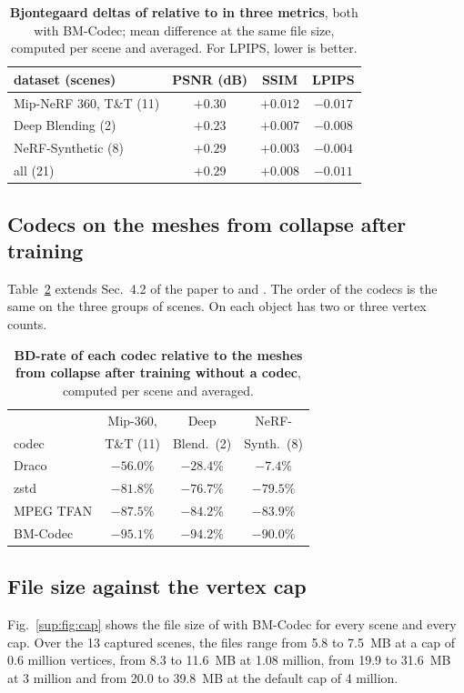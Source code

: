 \begin{table}[h]\centering\footnotesize
\caption{\textbf{Bjontegaard deltas of \BM relative to \MSc in three metrics}, both with BM-Codec; mean difference at the same file size, computed per scene and averaged. For LPIPS, lower is better.}
\label{sup:tab:bd-metrics}
\begin{tabular}{@{}lccc@{}}
\toprule
dataset (scenes) & PSNR (dB) & SSIM & LPIPS \\
\midrule
Mip-NeRF 360, T\&T (11) & $+0.30$ & $+0.012$ & $-0.017$ \\
Deep Blending (2) & $+0.23$ & $+0.007$ & $-0.008$ \\
NeRF-Synthetic (8) & $+0.29$ & $+0.003$ & $-0.004$ \\
all (21) & $+0.29$ & $+0.008$ & $-0.011$ \\
\bottomrule
\end{tabular}
\end{table}

\subsection{Codecs on the meshes from collapse after training}
Table~\ref{sup:tab:collapse-bd} extends Sec.~4.2 of the paper to \DeepBlending and \NeRFSyn. The order of the codecs is the same on the three groups of scenes. On \NeRFSyn each object has two or three vertex counts.

\begin{table}[h]\centering\footnotesize
\caption{\textbf{BD-rate of each codec relative to the meshes from collapse after training without a codec}, computed per scene and averaged.}
\label{sup:tab:collapse-bd}
\begin{tabular}{@{}lccc@{}}
\toprule
 & Mip-360, & Deep & NeRF- \\
codec & T\&T (11) & Blend.\ (2) & Synth.\ (8) \\
\midrule
Draco & $-56.0\%$ & $-28.4\%$ & $-7.4\%$ \\
zstd & $-81.8\%$ & $-76.7\%$ & $-79.5\%$ \\
MPEG TFAN & $-87.5\%$ & $-84.2\%$ & $-83.9\%$ \\
BM-Codec & $-95.1\%$ & $-94.2\%$ & $-90.0\%$ \\
\bottomrule
\end{tabular}
\end{table}

\subsection{File size against the vertex cap}
Fig.~\ref{sup:fig:cap} shows the file size of \MSc with BM-Codec for every scene and every cap. Over the 13 captured scenes, the files range from 5.8 to 7.5~MB at a cap of 0.6 million vertices, from 8.3 to 11.6~MB at 1.08 million, from 19.9 to 31.6~MB at 3 million and from 20.0 to 39.8~MB at the default cap of 4 million.

